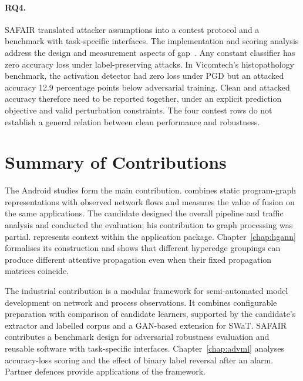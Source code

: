 \paragraph{RQ4.} \emph{\rqFourText} SAFAIR translated attacker assumptions into a contest
protocol and a benchmark with task-specific interfaces. The implementation and scoring analysis
address the design and measurement aspects of gap~. Any constant classifier has zero
accuracy loss under label-preserving attacks. In Vicomtech's histopathology benchmark,
the activation detector had zero loss under PGD but an attacked accuracy 12.9 percentage points
below adversarial training. Clean and attacked accuracy therefore need to be reported together,
under an explicit prediction objective and valid perturbation constraints. The four contest
rows do not establish a general relation between clean performance and robustness.

\section{Summary of Contributions}
\label{sec:conclusion:2}

The Android studies form the main contribution. \hybroid{} combines static program-graph
representations with observed network flows and measures the value of fusion on the same
applications. The candidate designed the overall pipeline and traffic analysis and conducted
the evaluation; his contribution to graph processing was partial.
\hgann{} represents context within the application package. Chapter~\ref{chap:hgann}
formalises its construction and shows that different hyperedge groupings can produce different
attentive propagation even when their fixed propagation matrices coincide.

The industrial contribution is a modular framework for semi-automated model development on
network and process observations. It combines configurable preparation with comparison of
candidate learners, supported by the candidate's extractor and labelled corpus and a GAN-based
extension for SWaT.
SAFAIR contributes a benchmark design for adversarial robustness evaluation and reusable
software with task-specific interfaces. Chapter~\ref{chap:advml} analyses accuracy-loss scoring and the effect of binary
label reversal after an alarm. Partner defences provide applications of the framework.


